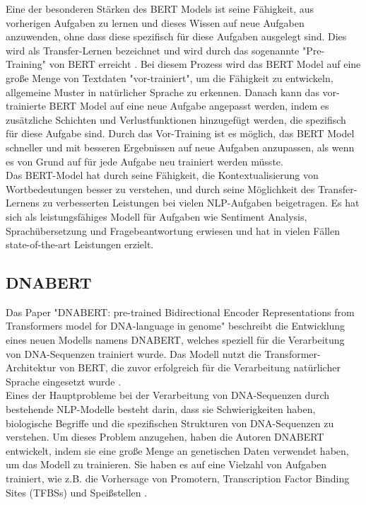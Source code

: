 \documentclass[oneside,bibliography=totocnumbered,BCOR=5mm]{scrbook}%
\theoremstyle{definition}
\theoremstyle{definition}
\theoremstyle{definition}
\theoremstyle{definition}
\theoremstyle{definition}
\theoremstyle{definition}
\begin{document}
Eine der besonderen Stärken des BERT Models ist seine Fähigkeit, aus vorherigen Aufgaben zu lernen und 
dieses Wissen auf neue Aufgaben anzuwenden, ohne dass diese spezifisch für diese Aufgaben ausgelegt sind. 
Dies wird als Transfer-Lernen bezeichnet und wird durch das sogenannte "Pre-Training" von BERT erreicht \autocite[Seite 3]{bert}. 
Bei diesem Prozess wird das BERT Model auf eine große Menge von Textdaten "vor-trainiert", 
um die Fähigkeit zu entwickeln, allgemeine Muster in natürlicher Sprache zu erkennen. 
Danach kann das vor-trainierte BERT Model auf eine neue Aufgabe angepasst werden, 
indem es zusätzliche Schichten und Verlustfunktionen hinzugefügt werden, die spezifisch für diese Aufgabe sind. 
Durch das Vor-Training ist es möglich, das BERT Model schneller und mit besseren Ergebnissen auf neue Aufgaben anzupassen, 
als wenn es von Grund auf für jede Aufgabe neu trainiert werden müsste. \\


Das BERT-Model hat durch seine Fähigkeit, die Kontextualisierung von Wortbedeutungen besser zu verstehen, 
und durch seine Möglichkeit des Transfer-Lernens
zu verbesserten Leistungen bei vielen NLP-Aufgaben beigetragen. 
Es hat sich als leistungsfähiges Modell für Aufgaben wie Sentiment Analysis, 
Sprachübersetzung und Fragebeantwortung erwiesen und hat in vielen Fällen state-of-the-art Leistungen erzielt. \\


\subsection{DNABERT}

Das Paper "DNABERT: pre-trained Bidirectional Encoder Representations from Transformers model 
for DNA-language in genome" beschreibt die Entwicklung eines neuen Modells namens DNABERT, 
welches speziell für die Verarbeitung von DNA-Sequenzen trainiert wurde. 
Das Modell nutzt die Transformer-Architektur von BERT, die zuvor erfolgreich für die Verarbeitung 
natürlicher Sprache eingesetzt wurde \autocite[Seite 2113]{dnabert}. \\


Eines der Hauptprobleme bei der Verarbeitung von DNA-Sequenzen durch bestehende NLP-Modelle 
besteht darin, dass sie Schwierigkeiten haben, 
biologische Begriffe und die spezifischen Strukturen von DNA-Sequenzen zu verstehen. 
Um dieses Problem anzugehen, haben die Autoren DNABERT entwickelt, 
indem sie eine große Menge an genetischen Daten verwendet haben, 
um das Modell zu trainieren. 
Sie haben es auf eine Vielzahl von Aufgaben trainiert, wie z.B. 
die Vorhersage von Promotern, Transcription Factor Binding
Sites (TFBSs) und Speißstellen \autocite[Seite 2114]{dnabert}. \\
\end{document}
